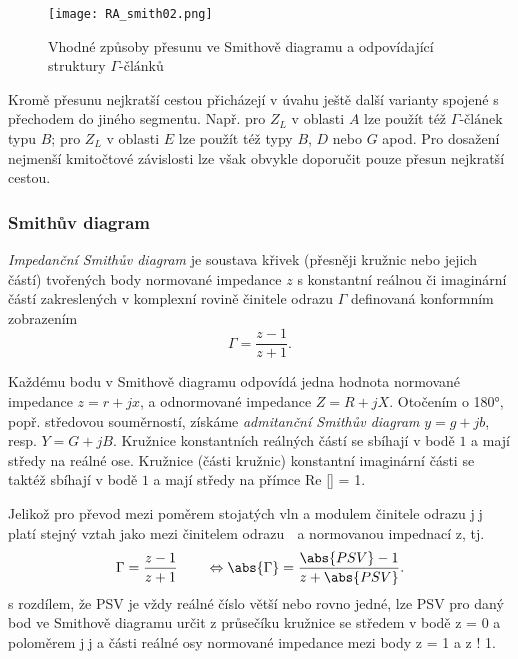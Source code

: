        \begin{figure}[ht!] %
          \centering
          \texttt{[image: RA\_smith02.png]}
          \caption{Vhodné způsoby přesunu ve Smithově diagramu a odpovídající struktury  
          \(\Gamma\text{-článků}\)}
          \label{RA:fig_smith02} 
        \end{figure}
           
        Kromě přesunu nejkratší cestou přicházejí v úvahu ještě další varianty spojené s přechodem 
        do jiného segmentu. Např. pro \(Z_L\) v oblasti \(A\) lze použít též 
        \(\Gamma\text{-článek}\) typu \(B\); pro \(Z_L\) v oblasti \(E\) lze použít též typy \(B\), 
        \(D\) nebo \(G\) apod. Pro dosažení nejmenší kmitočtové závislosti lze však obvykle 
        doporučit pouze přesun nejkratší cestou.
  
      \subsubsection{Smithův diagram}
        \emph{Impedanční Smithův diagram} je soustava křivek (přesněji kružnic nebo jejich částí) 
        tvořených body normované impedance \(z\) s konstantní reálnou či imaginární částí 
        zakreslených v komplexní rovině činitele odrazu \(\Gamma\) definovaná konformním zobrazením
        \begin{equation}\label{RA:eq_smith07}
          \Gamma = \frac{z-1}{z+1}.
        \end{equation} 
  
        Každému bodu v Smithově diagramu odpovídá jedna hodnota normované impedance \(z = r + jx\), 
        a odnormované impedance \(Z = R+jX\). Otočením o 180°, popř. středovou souměrností, 
        získáme \emph{admitanční Smithův diagram} \(y = g + jb\), resp. \(Y = G + jB\). Kružnice 
        konstantních reálných částí se sbíhají v bodě \(1\) a mají středy na reálné ose. Kružnice 
        (části kružnic) konstantní imaginární části se taktéž sbíhají v bodě \(1\) a mají středy na 
        přímce Re [] = 1.
  
        Jelikož pro převod mezi poměrem stojatých vln a modulem činitele odrazu j􀀀j platí stejný 
        vztah jako mezi činitelem odrazu 􀀀 a normovanou impednací z, tj.
        \begin{equation}\label{RA:eq_smith08}
          \Gamma = \frac{z-1}{z+1} \qquad \Leftrightarrow 
          \abs{\Gamma} = \frac{\abs{PSV}-1}{z+\abs{PSV}}.
        \end{equation} 
        s rozdílem, že PSV je vždy reálné číslo větší nebo rovno jedné, lze PSV pro daný bod ve 
        Smithově diagramu určit z průsečíku kružnice se středem v bodě z = 0 a poloměrem j􀀀j a 
        části reálné osy normované impedance mezi body z = 1 a z ! 1.
        
